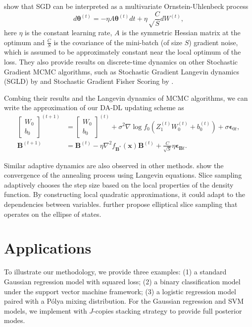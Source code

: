 \documentclass[ba]{imsart}
\newcommand{\bm}[1]{\boldsymbol{#1}}
\def\B{\bm{B}}
\def\btheta{\bm{\theta}}
\newcommand{\bx}{{\bm x}}
\newcommand{\bepsilon}{{\bm \epsilon}}
\numberwithin{equation}{section}
\theoremstyle{plain}
\begin{document}

\citet{mandt2017stochastic} show that SGD can be interpreted as a multivariate Ornstein-Uhlenbeck process
\[
d \btheta^{(t)}=-\eta A \btheta^{(t)} dt +\eta \sqrt\frac{C}{ S}  d W^{(t)},
\]
here $\eta$ is the constant learning rate, $A$ is the symmetric Hessian matrix at the optimum and $\frac{C}{S}$ is the covariance of the mini-batch (of size $S$) gradient noise, which is assumed to be approximately constant near the local optimum of the loss. They also provide results on discrete-time dynamics on other Stochastic Gradient MCMC algorithms, such as Stochastic Gradient Langevin dynamics (SGLD) by \citet{welling2011bayesian}  and Stochastic Gradient Fisher Scoring by \citet{ahn2012bayesian}.

Combing their results and the Langevin dynamics of MCMC algorithms, we can write the approximation of our DA-DL updating scheme as
\begin{align*}
\left[\begin{array}{c}
W_0\\
b_0
\end{array}
\right]^{(t+1)}&=\left[\begin{array}{c}
W_0\\
b_0
\end{array}
\right]^{(t)}+\sigma^2\nabla\log f_0(Z_1^{(t)}W_0^{(t)}+b_0^{(t)})+\sigma \bepsilon_{0t},\\
\B^{(t+1)}&=\B^{(t)}-\eta\nabla^2 f_{\B^*}(\bx)\B^{(t)}+\frac{C}{\sqrt S}\eta \bepsilon_{\B t}.
\end{align*}


Similar adaptive dynamics are also observed in other methods. \citet{geman1986diffusions} show the convergence of the annealing process using Langevin equations.  Slice sampling \citep{neal2003slice} adaptively chooses the step size based on  the local properties of the density function. By constructing local quadratic approximations, it could adapt to the dependencies between variables. \citet{murray2010elliptical} further propose elliptical slice sampling that operates on the ellipse of states.

\section{Applications}\label{sec:app}
To illustrate our methodology, we provide three examples: (1) a standard Gaussian regression model with squared loss; (2) a binary classification model under the support vector machine framework; (3) a logistic regression model paired with a P\'{o}lya mixing distribution. For the Gaussian regression and SVM models, we implement with $J$-copies stacking strategy to provide full posterior modes. 
\end{document}
